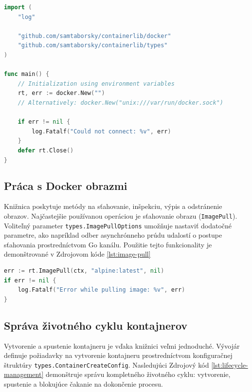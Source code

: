 \documentclass[
 program=infpvs,
  language=slovak,
  figures=false,
  tables=false,
  sourcecodes,
  glossaries,
  index
]{kidiplom}
\begin{document}
{\clearpage

\begin{lstlisting}[language=Go, caption={Inicializácia klienta.}, label={lst:initialization}]
import (
    "log"

    "github.com/samtaborsky/containerlib/docker"
    "github.com/samtaborsky/containerlib/types"
)

func main() {
    // Initialization using environment variables
    rt, err := docker.New("")
    // Alternatively: docker.New("unix:///var/run/docker.sock")
    
    if err != nil {
        log.Fatalf("Could not connect: %v", err)
    }
    defer rt.Close()
}
\end{lstlisting}



\subsection{Práca s Docker obrazmi}  \label{sec:docs-obrazy}
Knižnica poskytuje metódy na sťahovanie, inšpekciu, výpis a odstránenie obrazov. Najčastejšie používanou operáciou je sťahovanie obrazu (\texttt{ImagePull}). Voliteľný parameter \texttt{types.ImagePullOptions} umožňuje nastaviť dodatočné parametre, ako napríklad odber asynchrónneho prúdu udalostí o postupe sťahovania prostredníctvom Go kanálu. Použitie tejto funkcionality je demonštrované v Zdrojovom kóde \ref{lst:image-pull}

\begin{lstlisting}[language=Go, caption={Ukážka stiahnutia obrazu.}, label={lst:image-pull}]
err := rt.ImagePull(ctx, "alpine:latest", nil)
if err != nil {
    log.Fatalf("Error while pulling image: %v", err)
}
\end{lstlisting}



\subsection{Správa životného cyklu kontajnerov}  \label{sec:docs-lifecycle}
Vytvorenie a spustenie kontajneru je vďaka knižnici veľmi jednoduché. Vývojár definuje požiadavky na vytvorenie kontajneru prostredníctvom konfiguračnej štruktúry \texttt{types.ContainerCreateConfig}. Nasledujúci Zdrojový kód \ref{lst:lifecycle-management} demonštruje správu kompletného životného cyklu: vytvorenie, spustenie a blokujúce čakanie na dokončenie procesu.

\clearpage

}
\end{document}
